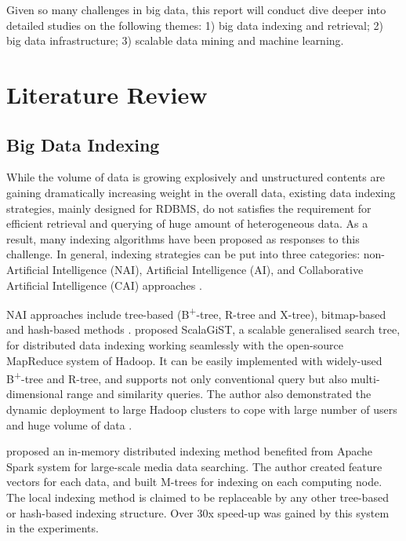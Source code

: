 \documentclass[conference]{IEEEtran}
\begin{document}
Given so many challenges in big data, this report will conduct dive
deeper into detailed studies on the following themes: 1) big data
indexing and retrieval; 2) big data infrastructure; 3) scalable data
mining and machine learning.

\hypertarget{literature-review}{%
\section{Literature Review}\label{literature-review}}

\hypertarget{big-data-indexing}{%
\subsection{Big Data Indexing}\label{big-data-indexing}}

While the volume of data is growing explosively and unstructured
contents are gaining dramatically increasing weight in the overall data,
existing data indexing strategies, mainly designed for RDBMS, do not
satisfies the requirement for efficient retrieval and querying of huge
amount of heterogeneous data\autocite{gani2016,Pouyanfar2018}. As a
result, many indexing algorithms have been proposed as responses to this
challenge. In general, indexing strategies can be put into three
categories: non-Artificial Intelligence (NAI), Artificial Intelligence
(AI), and Collaborative Artificial Intelligence (CAI) approaches
\autocite{gani2016,Pouyanfar2018}.

NAI approaches include tree-based (B\textsuperscript{+}-tree, R-tree and
X-tree), bitmap-based and hash-based methods \autocite{gani2016}.
\textcite{lu2014} proposed ScalaGiST, a scalable generalised search
tree, for distributed data indexing working seamlessly with the
open-source MapReduce system of Hadoop. It can be easily implemented
with widely-used B\textsuperscript{+}-tree and R-tree, and supports not
only conventional query but also multi-dimensional range and similarity
queries. The author also demonstrated the dynamic deployment to large
Hadoop clusters to cope with large number of users and huge volume of
data \autocite{lu2014}.

\textcite{ma2017} proposed an in-memory distributed indexing method
benefited from Apache Spark system for large-scale media data searching.
The author created feature vectors for each data, and built M-trees for
indexing on each computing node. The local indexing method is claimed to
be replaceable by any other tree-based or hash-based indexing structure.
Over 30x speed-up was gained by this system in the experiments.
\end{document}
